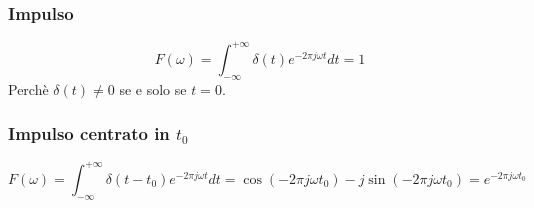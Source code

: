 \documentclass[12pt, a4paper]{report}
\begin{document}
\subsubsection{Impulso}
\begin{equation*}
    F(\omega) = \int_{-\infty}^{+\infty} \delta(t)e^{-2\pi j\omega t}dt = 1
\end{equation*}
Perchè $\delta(t)\neq 0 $ se e solo se $t=0$.
\subsubsection{Impulso centrato in $t_{0}$}
\begin{equation*}
    F(\omega) = \int_{-\infty}^{+\infty} \delta(t-t_{0})e^{-2\pi j\omega t}dt = \cos(-2\pi j\omega t_{0})-j\sin(-2\pi j\omega t_{0}) = e^{-2\pi j\omega t_{0}}
\end{equation*}
\end{document}

